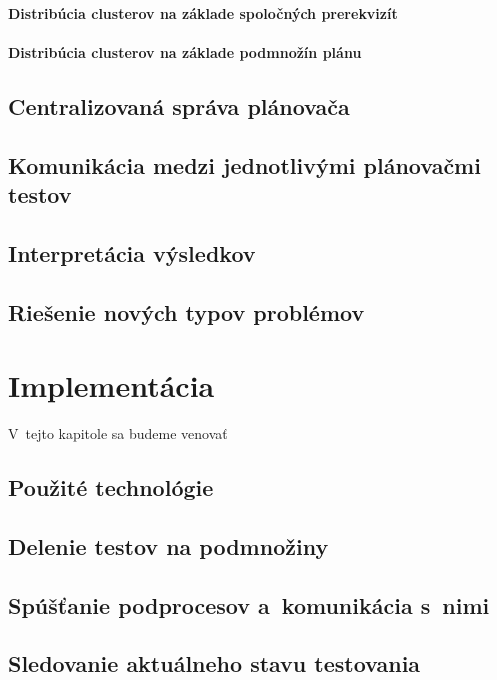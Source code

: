 \subsubsection*{Distribúcia clusterov na základe spoločných prerekvizít}
\subsubsection*{Distribúcia clusterov na základe podmnožín plánu}



 

\section{Centralizovaná správa plánovača}
\label{sekcia:centralizovana_sprava}

\section{Komunikácia medzi jednotlivými plánovačmi testov}
\label{sekcia:komunikacia}

\section{Interpretácia výsledkov}
\label{sekcia:interpretacia_vysledkov}

\section{Riešenie nových typov problémov}
\label{sekcia:riesenie_problemov}


\chapter{Implementácia}
V~tejto kapitole sa budeme venovať 
\section{Použité technológie}
\section{Delenie testov na podmnožiny}
\section{Spúšťanie podprocesov a~komunikácia s~nimi}
\section{Sledovanie aktuálneho stavu testovania}
